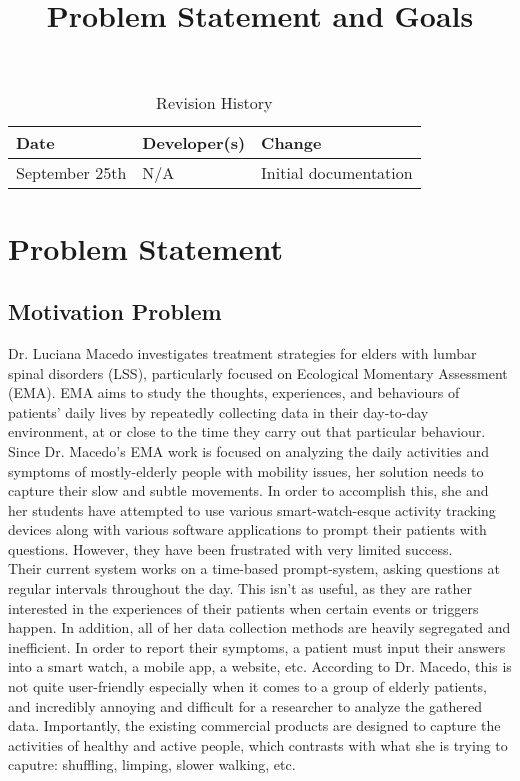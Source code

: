 \documentclass{article}
\title{Problem Statement and Goals\\\progname}
\author{\authname}
\date{}
\begin{document}
\maketitle

\begin{table}[hp]
\caption{Revision History} \label{TblRevisionHistory}
\begin{tabularx}{\textwidth}{llX}
\toprule
\textbf{Date} & \textbf{Developer(s)} & \textbf{Change}\\
\midrule
September 25th & N/A & Initial documentation\\
\bottomrule
\end{tabularx}
\end{table}

\newpage

\section{Problem Statement}

\subsection{Motivation Problem}

Dr. Luciana Macedo investigates treatment strategies for elders with  lumbar spinal disorders (LSS), particularly focused on Ecological Momentary Assessment (EMA). EMA aims to study the thoughts, experiences, and behaviours of patients' daily lives by repeatedly collecting data in their day-to-day environment, at or close to the time they carry out that particular behaviour.\\

Since Dr. Macedo's EMA work is focused on analyzing the daily activities and symptoms of mostly-elderly people with mobility issues, her solution needs to capture their slow and subtle movements. In order to accomplish this, she and her students have attempted to use various smart-watch-esque activity tracking devices along with various software applications to prompt their patients with questions. However, they have been frustrated with very limited success.\\

Their current system works on a time-based prompt-system, asking questions at regular intervals throughout the day. This isn't as useful, as they are rather interested in the experiences of their patients when certain events or triggers happen. In addition, all of her data collection methods are heavily segregated and inefficient. In order to report their symptoms, a patient must input their answers into a smart watch, a mobile app, a website, etc. According to Dr. Macedo, this is not quite user-friendly especially when it comes to a group of elderly patients, and incredibly annoying and difficult for a researcher to analyze the gathered data. Importantly, the existing commercial products are designed to capture the activities of healthy and active people, which contrasts with what she is trying to caputre: shuffling, limping, slower walking, etc.\\
\end{document}
